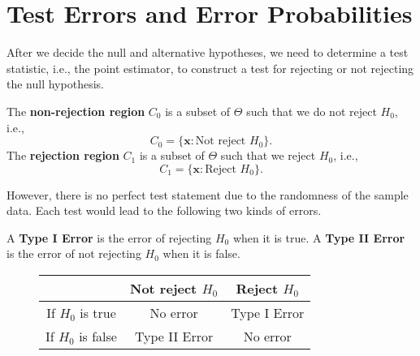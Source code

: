 \documentclass{huhtakm-template-book-v2}
\begin{document}
\section{Test Errors and Error Probabilities}
    After we decide the null and alternative hypotheses, we need to determine a test statistic, i.e., the point estimator, to construct a test for rejecting or not rejecting the null hypothesis.
    \begin{defn}
        The \textbf{non-rejection region} $C_{0}$ is a subset of $\Theta$ such that we do not reject $H_{0}$, i.e.,
        \begin{equation*}
            C_{0}=\{\mathbf{x}:\text{Not reject }H_{0}\}.
        \end{equation*}
        The \textbf{rejection region} $C_{1}$ is a subset of $\Theta$ such that we reject $H_{0}$, i.e.,
        \begin{equation*}
            C_{1}=\{\mathbf{x}:\text{Reject }H_{0}\}.
        \end{equation*}
    \end{defn}
    However, there is no perfect test statement due to the randomness of the sample data. Each test would lead to the following two kinds of errors.
    \begin{defn}
        A \textbf{Type I Error} is the error of rejecting $H_{0}$ when it is true. A \textbf{Type II Error} is the error of not rejecting $H_{0}$ when it is false.
    \end{defn}
    \begin{figure}[h]
        \centering
        \begin{tabular}{|c||c|c|}
            \hline
            & Not reject $H_{0}$ & Reject $H_{0}$\\
            \hline
            If $H_{0}$ is true & No error & Type I Error\\
            If $H_{0}$ is false & Type II Error & No error\\
            \hline
        \end{tabular}
    \end{figure}
    \newpage
    
\end{document}
